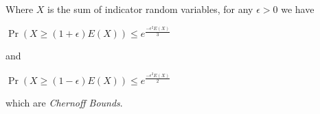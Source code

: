 Where $X$ is the sum of indicator random variables, for any $ \epsilon
> 0 $ we have

\begin{center}
  \begin{math}
    \Pr ( X \geq ( 1 + \epsilon ) E(X) ) \leq e^{ \frac{-\epsilon^2 E(X)}{3}}
  \end{math}
\end{center}

and

\begin{center}
  \begin{math}
    \Pr ( X \geq ( 1 - \epsilon ) E(X) ) \leq e^{ \frac{-\epsilon^2 E(X)}{2}}
  \end{math}
\end{center}

which are \emph{Chernoff Bounds}.
